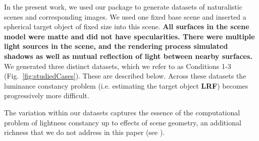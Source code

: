 \documentclass{jov}
\providecommand{\DIFaddtex}[1]{{\bf #1}} %
\providecommand{\DIFdeltex}[1]{} %
\providecommand{\DIFaddbegin}{} %
\providecommand{\DIFaddend}{} %
\providecommand{\DIFdelbegin}{} %
\providecommand{\DIFdelend}{} %
\providecommand{\DIFadd}[1]{\texorpdfstring{\DIFaddtex{#1}}{#1}} %
\providecommand{\DIFdel}[1]{\texorpdfstring{\DIFdeltex{#1}}{}} %
\newcommand{\DIFscaledelfig}{0.5}
\newlength{\DIFdelgraphicswidth} %
\newlength{\DIFdelgraphicsheight} %
\newcommand{\DIFaddincludegraphics}[2][]{{\color{blue}\fbox{\DIFOincludegraphics[#1]{#2}}}} %
\newcommand{\DIFdelincludegraphics}[2][]{%
\sbox{\DIFdelgraphicsbox}{\DIFOincludegraphics[#1]{#2}}%
\settoboxwidth{\DIFdelgraphicswidth}{\DIFdelgraphicsbox} %
\settoboxtotalheight{\DIFdelgraphicsheight}{\DIFdelgraphicsbox} %
\scalebox{\DIFscaledelfig}{%
\parbox[b]{\DIFdelgraphicswidth}{\usebox{\DIFdelgraphicsbox}\\[-\baselineskip] \rule{\DIFdelgraphicswidth}{0em}}\llap{\resizebox{\DIFdelgraphicswidth}{\DIFdelgraphicsheight}{%
\setlength{\unitlength}{\DIFdelgraphicswidth}%
\begin{picture}(1,1)%
\thicklines\linethickness{2pt} %
{\color[rgb]{1,0,0}\put(0,0){\framebox(1,1){}}}%
{\color[rgb]{1,0,0}\put(0,0){\line( 1,1){1}}}%
{\color[rgb]{1,0,0}\put(0,1){\line(1,-1){1}}}%
\end{picture}%
}\hspace*{3pt}}} %
} %
\DeclareRobustCommand{\DIFaddbegin}{\DIFOaddbegin \let\includegraphics\DIFaddincludegraphics} %
\DeclareRobustCommand{\DIFaddend}{\DIFOaddend \let\includegraphics\DIFOincludegraphics} %
\DeclareRobustCommand{\DIFdelbegin}{\DIFOdelbegin \let\includegraphics\DIFdelincludegraphics} %
\DeclareRobustCommand{\DIFdelend}{\DIFOaddend \let\includegraphics\DIFOincludegraphics} %
\begin{document}
In the present work, we used our package to generate datasets of naturalistic scenes and corresponding images.
We used one fixed base scene and inserted a spherical target object of fixed size into this scene.
\DIFaddbegin \DIFadd{All surfaces in the scene model were matte and did not have specularities.
There were multiple light sources in the scene, and the rendering process simulated shadows as well as mutual reflection of light between nearby surfaces.
}\DIFaddend We generated three distinct datasets, which we refer to as Conditions 1-3 (Fig.~\ref{fig:studiedCases}). These are described below.
Across these datasets the luminance constancy problem (i.e. estimating the target object \DIFdelbegin \DIFdel{LRV}\DIFdelend \DIFaddbegin \DIFadd{LRF}\DIFaddend )
becomes progressively more difficult.

The variation within our datasets captures the essence of the computational problem of lightness constancy
up to effects of scene geometry, an additional richness that we do not address in this paper (see ).
\end{document}
